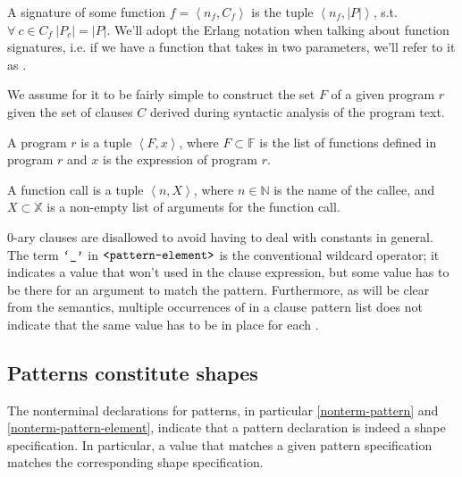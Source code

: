 \begin{definition} A signature of some function $f=\left\langle n_f,C_f
\right\rangle$ is the tuple $\left\langle n_f,|P| \right\rangle$, s.t.
$\forall\ c\in C_f\ |P_c|=|P|$.  We'll adopt the Erlang notation when talking
about function signatures, i.e. if we have a function  that takes in
two parameters, we'll refer to it as .\end{definition}

We assume for it to be fairly simple to construct the set $F$ of a given
program $r$ given the set of clauses $C$ derived during syntactic analysis of
the program text.

\begin{definition} A program $r$ is a tuple $\left\langle F,x \right\rangle$,
where $F\subset\mathbb{F}$ is the list of functions defined in program $r$ and
$x$ is the expression of program $r$.\end{definition}

\begin{definition} A function call is a tuple $\left\langle n, X
\right\rangle$, where $n\in\mathbb{N}$ is the name of the callee, and
$X\subset\mathbb{X}$ is a non-empty list of arguments for the function
call.\end{definition}

0-ary clauses are disallowed to avoid having to deal with constants in general.
The term $\text{{\ttfamily`\_'}}$ in $\text{{\ttfamily<pattern-element>}}$ is the conventional
wildcard operator; it indicates a value that won't used in the clause
expression, but some value has to be there for an argument to match the
pattern. Furthermore, as will be clear from the semantics, multiple occurrences
of \term{\_} in a clause pattern list does not indicate that the same value has
to be in place for each \term{\_}. 



\subsection{Patterns constitute shapes}

The nonterminal declarations for patterns, in particular \ref{nonterm-pattern}
and \ref{nonterm-pattern-element}, indicate that a pattern declaration is
indeed a shape specification. In particular, a value that matches a given
pattern specification matches the corresponding shape specification.

